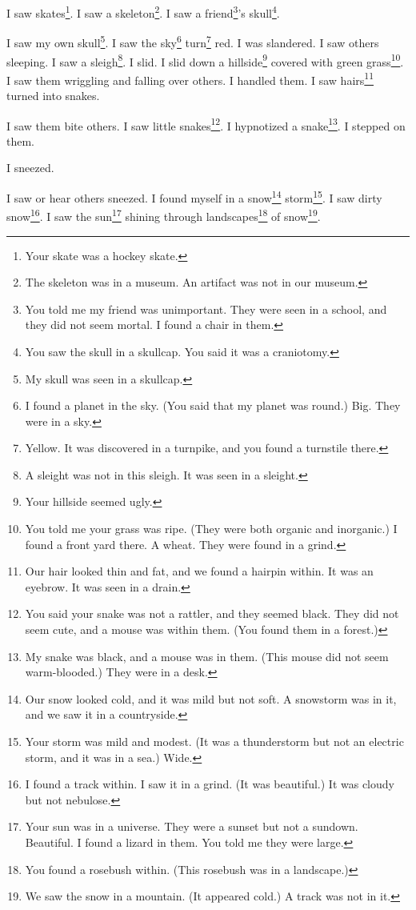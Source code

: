 \documentclass[12pt]{book}
\begin{document}
 I saw skates\footnote{Your skate was a hockey skate.}. I saw a skeleton\footnote{The skeleton was in a museum. An artifact was not in our museum.}. I saw a friend\footnote{You told me my friend was unimportant. They were seen in a school, and they did not seem mortal. I found a chair in them.}'s skull\footnote{You saw the skull in a skullcap. You said it was a craniotomy.}. 

 I saw my own skull\footnote{My skull was seen in a skullcap.}. I saw the sky\footnote{I found a planet in the sky. (You said that my planet was round.) Big. They were in a sky.} turn\footnote{Yellow. It was discovered in a turnpike, and you found a turnstile there.} red. I was slandered. I saw others sleeping. I saw a sleigh\footnote{A sleight was not in this sleigh. It was seen in a sleight.}. I slid. I slid down a hillside\footnote{Your hillside seemed ugly.} covered with green grass\footnote{You told me your grass was ripe. (They were both organic and inorganic.) I found a front yard there. A wheat. They were found in a grind.}. I saw them wriggling and falling over others. I handled them. I saw hairs\footnote{Our hair looked thin and fat, and we found a hairpin within. It was an eyebrow. It was seen in a drain.} turned into snakes. 

 I saw them bite others. I saw little snakes\footnote{You said your snake was not a rattler, and they seemed black. They did not seem cute, and a mouse was within them. (You found them in a forest.)}. I hypnotized a snake\footnote{My snake was black, and a mouse was in them. (This mouse did not seem warm-blooded.) They were in a desk.}. I stepped on them. 

 I sneezed. 

 I saw or hear others sneezed. I found myself in a snow\footnote{Our snow looked cold, and it was mild but not soft. A snowstorm was in it, and we saw it in a countryside.} storm\footnote{Your storm was mild and modest. (It was a thunderstorm but not an electric storm, and it was in a sea.) Wide.}. I saw dirty snow\footnote{I found a track within. I saw it in a grind. (It was beautiful.) It was cloudy but not nebulose.}. I saw the sun\footnote{Your sun was in a universe. They were a sunset but not a sundown. Beautiful. I found a lizard in them. You told me they were large.} shining through landscapes\footnote{You found a rosebush within. (This rosebush was in a landscape.)} of snow\footnote{We saw the snow in a mountain. (It appeared cold.) A track was not in it.}. 
\end{document}

